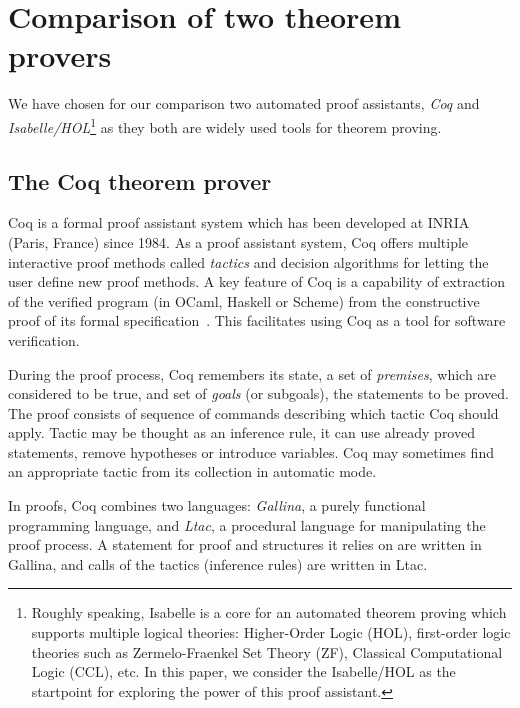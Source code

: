 \documentclass[article]{aaltoseries}
\begin{document}
\section{Comparison of two theorem provers}
\label{sec:comparison}

We have chosen for our comparison two automated proof assistants, \textit{Coq} and \textit{Isabelle/HOL}\footnote{Roughly speaking, Isabelle is a core for an automated theorem proving which supports multiple logical theories: Higher-Order Logic (HOL), first-order logic theories such as Zermelo-Fraenkel Set Theory (ZF), Classical Computational Logic (CCL), etc. In this paper, we consider the Isabelle/HOL as the startpoint for exploring the power of this proof assistant.} as they both are widely used tools for theorem proving.


\subsection{The Coq theorem prover}
\label{sec:prover_coq}

Coq is a formal proof assistant system which has been developed at INRIA (Paris, France) since 1984. As a proof assistant system, Coq offers multiple interactive proof methods called \textit{tactics} and decision algorithms for letting the user define new proof methods. A key feature of Coq is a capability of extraction of the verified program (in OCaml, Haskell or Scheme) from the constructive proof of its formal specification~\cite{tool_Coq}. This facilitates using Coq as a tool for software verification.

During the proof process, Coq remembers its state, a set of \textit{premises}, which are considered to be true, and set of \textit{goals} (or subgoals), the statements to be proved. The proof consists of sequence of commands describing which tactic Coq should apply. Tactic may be thought as an inference rule, it can use already proved statements, remove hypotheses or introduce variables. Coq may sometimes find an appropriate tactic from its collection in automatic mode.

In proofs, Coq combines two languages: \textit{Gallina}, a purely functional programming language, and \textit{Ltac}, a procedural language for manipulating the proof process. A statement for proof and structures it relies on are written in Gallina, and calls of the tactics (inference rules) are written in Ltac.
\end{document}
